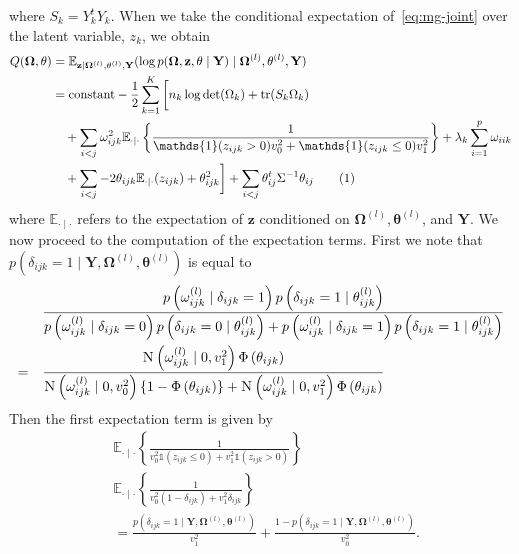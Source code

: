 \documentclass[a4paper, 11pt, oneside]{report}
\DeclareMathOperator{\tr}{tr}
\newcommand{\E}{\mathbb{E}}
\newcommand{\1}{\mathds{1}}
\newcommand{\powl}{^{(l)}}
\newcommand{\inv}{^{-1}}
\newcommand{\Nor}{\textsc{N}}
\newcommand{\bOmega}{\mathbf{\Omega}}
\newcommand{\bz}{\mathbf{z}}
\newcommand{\btheta}{\mathbf{\theta}}
\newcommand{\bY}{\mathbf{Y}}
\begin{document}
where $S_k = Y_k^t Y_k$.
When we take the conditional expectation of~\eqref{eq:mg-joint} over the latent
variable, $z_k$, we obtain
\begin{align*}
	Q(\mathbf{\Omega}, \mathbf{\theta}) & =  \E_{\mathbf{z} \mid
	\mathbf{\Omega}\powl, \mathbf{\theta}\powl, \mathbf{Y}}(\log
	p(\mathbf{\Omega},  \mathbf{z}, \mathbf{\theta} \mid \mathbf{Y}) \mid
	\mathbf{\Omega}\powl, \mathbf{\theta}\powl, \mathbf{Y})                    \\
	                                    & =  \text{constant} -
	\frac{1}{2} \sum_{k=1}^K \bigg[ n_k \log\det(\Omega_k) +
	\tr(S_k \Omega_k)                                                          \\
	                                    & \quad + \sum_{i < j}
	\omega_{ijk}^2\E_{\cdot \mid \cdot}\left\{\frac{1}{\1(z_{ijk} > 0)v^2_0 +
		\1(z_{ijk} \leq 0)v^2_1}\right\} + \lambda_k \sum_{i=1}^p \omega_{iik}
	\\
	                                    & \quad + \sum_{i < j} -2 \theta_{ijk}
	\E_{\cdot \mid \cdot}(z_{ijk}) + \theta_{ijk}^2
	\bigg] + \sum_{i < j} \theta_{ij}^t \Sigma\inv \theta_{ij}
	\stepcounter{equation}\tag{\theequation}\label{eq:mg-exp}
\end{align*}
where $\E_{\cdot \mid \cdot}$ refers to the expectation of $\bz$ conditioned on
$\bOmega\powl, \btheta\powl$, and $\bY$.
We now proceed to the computation of the expectation terms.
First we note that $p(\delta_{ijk} = 1 \mid \bY, \bOmega\powl, \btheta\powl)$
is equal to
\begin{align*}
	       & \frac{p\left(\omega_{ijk}\powl \mid \delta_{ijk}=1\right) p\left(\delta_{ijk}=1 \mid
		\theta_{ijk}\powl\right)}{p\left(\omega_{ijk}\powl \mid \delta_{ijk}=0\right) p\left(\delta_{ijk}=0 \mid
		\theta_{ijk}\powl\right) + p\left(\omega_{ijk}\powl \mid \delta_{ijk}=1\right) p\left(\delta_{ijk}=1 \mid
	\theta_{ijk}\powl\right)}                                                                     \\
	=\quad & \frac{\Nor\left(\omega_{ijk}\powl \mid 0,
		v_1^2\right)\Phi\left(\theta_{ijk}\right)}{\Nor\left(\omega_{ijk}\powl \mid 0,
		v_0^2\right)\{1 -
		\Phi\left(\theta_{ijk}\right)\} +
		\Nor\left(\omega_{ijk}\powl \mid 0, v_1^2\right)
		\Phi\left(\theta_{ijk}\right)}
\end{align*}
Then the first expectation term is given by
\begin{align*}
	 & \E_{\cdot \mid \cdot} \left\{ \frac{1}{v_0^2 \1(z_{ijk} \leq 0) + v_1^2 \1(z_{ijk} > 0)} \right\} \\
	 & \E_{\cdot \mid \cdot} \left\{ \frac{1}{v_0^2 ( 1 - \delta_{ijk}) + v_1^2 \delta_{ijk}} \right\}   \\
	 & = \frac{p(\delta_{ijk} = 1 \mid \bY, \bOmega\powl, \btheta\powl)}{v_1^2}
	+ \frac{1 - p(\delta_{ijk} = 1 \mid \bY, \bOmega\powl,
		\btheta\powl)}{v_0^2}.
\end{align*}
\end{document}
